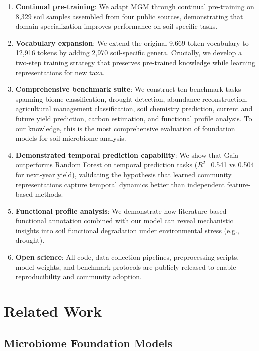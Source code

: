 \documentclass[11pt,a4paper]{article}
\begin{document}
\begin{enumerate}[leftmargin=1.5em]
    \item \textbf{Continual pre-training}: We adapt MGM through continual pre-training on 8,329 soil samples assembled from four public sources, demonstrating that domain specialization improves performance on soil-specific tasks.

    \item \textbf{Vocabulary expansion}: We extend the original 9,669-token vocabulary to 12,916 tokens by adding 2,970 soil-specific genera. Crucially, we develop a two-step training strategy that preserves pre-trained knowledge while learning representations for new taxa.

    \item \textbf{Comprehensive benchmark suite}: We construct ten benchmark tasks spanning biome classification, drought detection, abundance reconstruction, agricultural management classification, soil chemistry prediction, current and future yield prediction, carbon estimation, and functional profile analysis. To our knowledge, this is the most comprehensive evaluation of foundation models for soil microbiome analysis.

    \item \textbf{Demonstrated temporal prediction capability}: We show that Gaia outperforms Random Forest on temporal prediction tasks ($R^2$=0.541 vs 0.504 for next-year yield), validating the hypothesis that learned community representations capture temporal dynamics better than independent feature-based methods.

    \item \textbf{Functional profile analysis}: We demonstrate how literature-based functional annotation combined with our model can reveal mechanistic insights into soil functional degradation under environmental stress (e.g., drought).

    \item \textbf{Open science}: All code, data collection pipelines, preprocessing scripts, model weights, and benchmark protocols are publicly released to enable reproducibility and community adoption.
\end{enumerate}

\section{Related Work}

\subsection{Microbiome Foundation Models}
\end{document}
